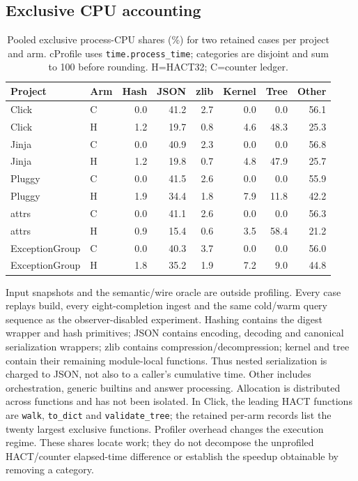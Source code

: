 \subsection{Exclusive CPU accounting}
\begin{table}[htbp]\centering\scriptsize
\caption{Pooled exclusive process-CPU shares (\%) for two retained cases per
project and arm. cProfile uses \texttt{time.process\_time}; categories are
disjoint and sum to 100 before rounding. H=HACT32; C=counter ledger.}
\label{tab:s-profile}
\begin{tabular}{@{}llrrrrrr@{}}\toprule
Project & Arm & Hash & JSON & zlib & Kernel & Tree & Other\\\midrule
Click & C & 0.0 & 41.2 & 2.7 & 0.0 & 0.0 & 56.1 \\
Click & H & 1.2 & 19.7 & 0.8 & 4.6 & 48.3 & 25.3 \\
Jinja & C & 0.0 & 40.9 & 2.3 & 0.0 & 0.0 & 56.8 \\
Jinja & H & 1.2 & 19.8 & 0.7 & 4.8 & 47.9 & 25.7 \\
Pluggy & C & 0.0 & 41.5 & 2.6 & 0.0 & 0.0 & 55.9 \\
Pluggy & H & 1.9 & 34.4 & 1.8 & 7.9 & 11.8 & 42.2 \\
attrs & C & 0.0 & 41.1 & 2.6 & 0.0 & 0.0 & 56.3 \\
attrs & H & 0.9 & 15.4 & 0.6 & 3.5 & 58.4 & 21.2 \\
ExceptionGroup & C & 0.0 & 40.3 & 3.7 & 0.0 & 0.0 & 56.0 \\
ExceptionGroup & H & 1.8 & 35.2 & 1.9 & 7.2 & 9.0 & 44.8 \\
\bottomrule\end{tabular}\end{table}
Input snapshots and the semantic/wire oracle are outside profiling. Every
case replays build, every eight-completion ingest and the same cold/warm query
sequence as the observer-disabled experiment. Hashing contains the digest
wrapper and hash primitives; JSON contains encoding, decoding and canonical
serialization wrappers; zlib contains compression/decompression; kernel and
tree contain their remaining module-local functions. Thus nested serialization
is charged to JSON, not also to a caller's cumulative time. Other includes
orchestration, generic builtins and answer processing. Allocation is distributed
across functions and has not been isolated. In Click, the leading HACT
functions are \texttt{walk}, \texttt{to\_dict} and \texttt{validate\_tree};
the retained per-arm records list the twenty largest exclusive functions.
Profiler overhead changes the execution regime. These shares locate work;
they do not decompose the unprofiled HACT/counter elapsed-time difference or
establish the speedup obtainable by removing a category.
